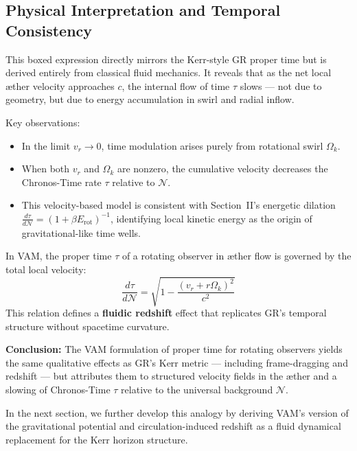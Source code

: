 \subsection{Physical Interpretation and Temporal Consistency}

This boxed expression directly mirrors the Kerr-style GR proper time but is derived entirely from classical fluid mechanics. It reveals that as the net local æther velocity approaches \( c \), the internal flow of time \( \tau \) slows — not due to geometry, but due to energy accumulation in swirl and radial inflow.

Key observations:

\begin{itemize}
 \item In the limit \( v_r \to 0 \), time modulation arises purely from rotational swirl \( \Omega_k \).
 \item When both \( v_r \) and \( \Omega_k \) are nonzero, the cumulative velocity decreases the Chronos-Time rate \( \tau \) relative to \( \mathcal{N} \).
 \item This velocity-based model is consistent with Section~II’s energetic dilation \( \frac{d\tau}{d\mathcal{N}} = (1 + \beta E_{\text{rot}})^{-1} \), identifying local kinetic energy as the origin of gravitational-like time wells.
\end{itemize}

\begin{tcolorbox}[colback=gray!5, colframe=black!70, sharp corners=southwest, title=Chronos-Time in a Rotating Æther]
In VAM, the proper time \( \tau \) of a rotating observer in æther flow is governed by the total local velocity:
\[
\frac{d\tau}{d\mathcal{N}} = \sqrt{1 - \frac{(v_r + r\Omega_k)^2}{c^2}}
\]
This relation defines a \textbf{fluidic redshift} effect that replicates GR's temporal structure without spacetime curvature.
\end{tcolorbox}

\textbf{Conclusion:} The VAM formulation of proper time for rotating observers yields the same qualitative effects as GR’s Kerr metric — including frame-dragging and redshift — but attributes them to structured velocity fields in the æther and a slowing of Chronos-Time \( \tau \) relative to the universal background \( \mathcal{N} \).

In the next section, we further develop this analogy by deriving VAM’s version of the gravitational potential and circulation-induced redshift as a fluid dynamical replacement for the Kerr horizon structure.
